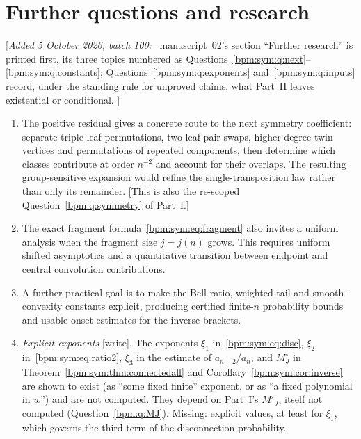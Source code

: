 \documentclass[11pt,a4paper]{article}
\theoremstyle{remark}\newtheorem{remark}[theorem]{Remark}%
\newenvironment{writenote}{\par\smallskip\noindent\small[\textit{Added 5 October 2026, batch 100:}\ }{]\par\smallskip}
\begin{document}
\section{Further questions and research}\label{bpm:sym:sec:questions}
\begin{writenote}
manuscript~02's section ``Further research'' is printed first, its three
topics numbered as Questions~\ref{bpm:sym:q:next}--\ref{bpm:sym:q:constants};
Questions~\ref{bpm:sym:q:exponents} and~\ref{bpm:sym:q:inputs} record, under
the standing rule for unproved claims, what Part~II leaves existential or
conditional.
\end{writenote}
\begin{enumerate}\renewcommand{\theenumi}{II.\arabic{enumi}}\renewcommand{\labelenumi}{\theenumi.}%
\item\label{bpm:sym:q:next} The positive residual gives a concrete route to the next symmetry coefficient: separate triple-leaf permutations, two leaf-pair swaps, higher-degree twin vertices and permutations of repeated components, then determine which classes contribute at order $n^{-2}$ and account for their overlaps. The resulting group-sensitive expansion would refine the single-transposition law rather than only its remainder.
[This is also the re-scoped Question~\ref{bpm:q:symmetry} of Part~I.]
\item\label{bpm:sym:q:fragment} The exact fragment formula~\eqref{bpm:sym:eq:fragment} also invites a uniform analysis when the fragment size $j=j(n)$ grows. This requires uniform shifted asymptotics and a quantitative transition between endpoint and central convolution contributions.
\item\label{bpm:sym:q:constants} A further practical goal is to make the Bell-ratio, weighted-tail and smooth-convexity constants explicit, producing certified finite-$n$ probability bounds and usable onset estimates for the inverse brackets.
\item\label{bpm:sym:q:exponents} \emph{Explicit exponents} [write].
The exponents $\xi_1$ in~\eqref{bpm:sym:eq:disc}, $\xi_2$
in~\eqref{bpm:sym:eq:ratio2}, $\xi_3$ in the estimate of $a_{n-2}/a_n$, and
$M^\circ_J$ in Theorem~\ref{bpm:sym:thm:connectedall} and
Corollary~\ref{bpm:sym:cor:inverse} are shown to exist (as ``some fixed
finite'' exponent, or as ``a fixed polynomial in $w$'') and are not
computed. They depend on Part~I's $M'_J$, itself not computed
(Question~\ref{bpm:q:MJ}). Missing: explicit values, at least for
$\xi_1$, which governs the third term of the disconnection probability.

\end{enumerate}
\end{document}
